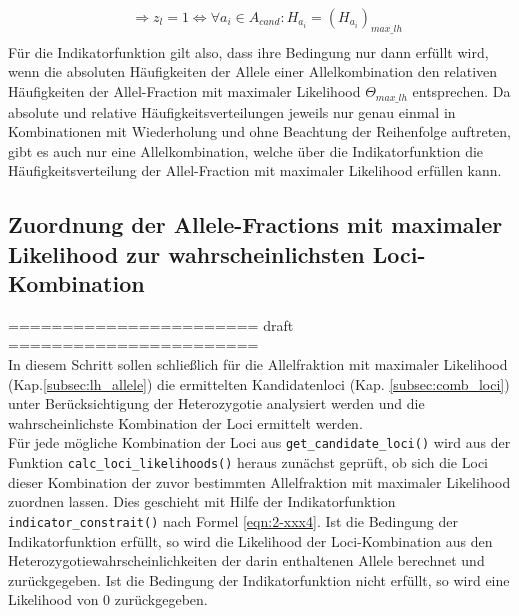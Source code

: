 \begin{center}
{{\begin{beweis}
\begin{equation}
\begin{aligned}
				&\ \Rightarrow z_{l} = 1 \Leftrightarrow \forall a_{i} \in A_{cand} : H_{a_{i}} = (H_{a_{i}})_{max\_lh} \\
				\end{aligned}
				\end{equation}
				Für die Indikatorfunktion gilt also, dass ihre Bedingung nur dann erfüllt wird, wenn die absoluten Häufigkeiten der Allele einer Allelkombination den relativen Häufigkeiten der Allel-Fraction mit maximaler Likelihood $ \Theta_{max\_lh} $ entsprechen. Da absolute und relative Häufigkeitsverteilungen jeweils nur genau einmal in Kombinationen mit Wiederholung und ohne Beachtung der Reihenfolge auftreten, gibt es auch nur eine Allelkombination, welche über die Indikatorfunktion die Häufigkeitsverteilung der Allel-Fraction mit maximaler Likelihood erfüllen kann.
			\end{beweis}
	}}
\end{center}



\subsection{Zuordnung der Allele-Fractions mit maximaler Likelihood zur wahrscheinlichsten Loci-Kombination} \label{subsec:lh_loci}



\noindent======================= draft =======================\\



In diesem Schritt sollen schließlich für die Allelfraktion mit maximaler Likelihood (Kap.\ref{subsec:lh_allele}) die ermittelten Kandidatenloci (Kap. \ref{subsec:comb_loci}) unter Berücksichtigung der Heterozygotie analysiert werden und die wahrscheinlichste Kombination der Loci ermittelt werden.\\

Für jede mögliche Kombination der Loci aus \lstinline|get_candidate_loci()| wird aus der Funktion \lstinline|calc_loci_likelihoods()| heraus zunächst geprüft, ob sich die Loci dieser Kombination der zuvor bestimmten Allelfraktion mit maximaler Likelihood zuordnen lassen. Dies geschieht mit Hilfe der Indikatorfunktion \lstinline|indicator_constrait()| nach Formel \eqref{eqn:2-xxx4}. Ist die Bedingung der Indikatorfunktion erfüllt, so wird die Likelihood der Loci-Kombination aus den Heterozygotiewahrscheinlichkeiten der darin enthaltenen Allele berechnet und zurückgegeben. Ist die Bedingung der Indikatorfunktion nicht erfüllt, so wird eine Likelihood von 0 zurückgegeben.\\

